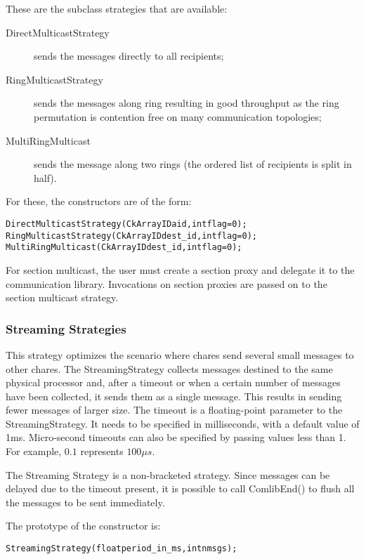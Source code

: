 {These are the subclass strategies that are available:

\begin{description}
\item[DirectMulticastStrategy] sends the messages directly to all recipients;
\item[RingMulticastStrategy] sends the messages along ring resulting in good throughput as the ring permutation is contention free on many communication topologies;
\item[MultiRingMulticast] sends the message along two rings (the ordered list of recipients is split in half).
\end{description}

For these, the constructors are of the form:

\begin{alltt}
DirectMulticastStrategy(CkArrayID aid, int flag=0);
RingMulticastStrategy(CkArrayID dest_id, int flag=0);
MultiRingMulticast(CkArrayID dest_id, int flag=0);
\end{alltt}

For section multicast, the user must create a section proxy and delegate it to
the communication library. Invocations on section proxies are passed on to the
section multicast strategy.


\subsubsection{Streaming Strategies}

This strategy optimizes the scenario where chares send several small messages to
other chares. The StreamingStrategy collects messages destined to the same
physical processor and, after a timeout or when a certain number of messages
have been collected, it sends them as a single message. This results in sending
fewer messages of larger size. The timeout is a floating-point parameter to the
StreamingStrategy. It needs to be specified in milliseconds, with a default
value of 1ms. Micro-second timeouts can also be specified by passing values less
than 1. For example, $0.1$ represents $100\mu s$.

The Streaming Strategy is a non-bracketed strategy. Since messages can be
delayed due to the timeout present, it is possible to call
{\textrm{ComlibEnd()}} to flush all the messages to be sent immediately.

The prototype of the constructor is:

\begin{alltt}
StreamingStrategy(float period\_in\_ms, int nmsgs);
\end{alltt}

}
